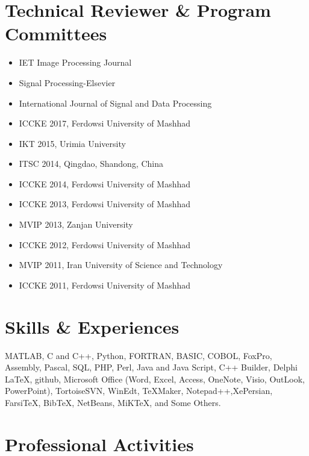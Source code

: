 \documentclass[10pt,a4paper]{moderncv}
\begin{document}
\section{Technical Reviewer \& Program Committees}

\begin{itemize}
\item IET Image Processing Journal
\item Signal Processing-Elsevier
\item International Journal of Signal and Data Processing
\item ICCKE 2017, Ferdowsi University of Mashhad
\item IKT 2015, Urimia University
\item ITSC 2014, Qingdao, Shandong, China
\item ICCKE 2014, Ferdowsi University of Mashhad
\item ICCKE 2013, Ferdowsi University of Mashhad
\item MVIP 2013, Zanjan University
\item ICCKE 2012, Ferdowsi University of Mashhad
\item MVIP 2011, Iran University of Science and Technology
\item ICCKE 2011, Ferdowsi University of Mashhad
\end{itemize}

\newpage
\section{Skills \& Experiences}
{MATLAB, C and C++, Python, FORTRAN, BASIC, COBOL, FoxPro,  Assembly, Pascal, SQL, PHP, Perl, Java and Java Script, C++ Builder, Delphi} {}{}{}{}
{ \LaTeX, github, Microsoft Office (Word, Excel, Access, OneNote, Visio,
 OutLook, PowerPoint), TortoiseSVN, WinEdt, TeXMaker, Notepad++,XePersian,
 Farsi\TeX, Bib\TeX, NetBeans, MiKTeX, and Some Others.} {}{}{}{}

\section{Professional Activities}
\end{document}
